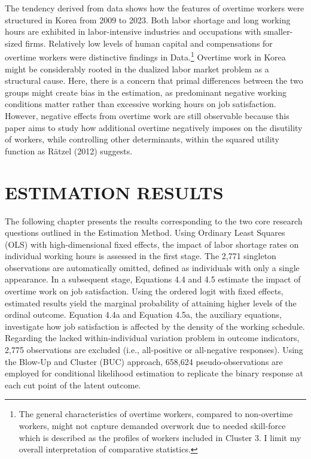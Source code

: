 \documentclass[
  12pt,
]{article}
\begin{document}
The tendency derived from data shows how the features of overtime
workers were structured in Korea from 2009 to 2023. Both labor shortage
and long working hours are exhibited in labor-intensive industries and
occupations with smaller-sized firms. Relatively low levels of human
capital and compensations for overtime workers were distinctive findings
in Data.\footnote{The general characteristics of overtime workers,
  compared to non-overtime workers, might not capture demanded overwork
  due to needed skill-force which is described as the profiles of
  workers included in Cluster 3. I limit my overall interpretation of
  comparative statistics.} Overtime work in Korea might be considerably
rooted in the dualized labor market problem as a structural cause. Here,
there is a concern that primal differences between the two groups might
create bias in the estimation, as predominant negative working
conditions matter rather than excessive working hours on job
satisfaction. However, negative effects from overtime work are still
observable because this paper aims to study how additional overtime
negatively imposes on the disutility of workers, while controlling other
determinants, within the squared utility function as Rätzel (2012)
suggests.

\newpage

\section{ESTIMATION RESULTS}\label{estimation-results}

The following chapter presents the results corresponding to the two core
research questions outlined in the Estimation Method. Using Ordinary
Least Squares (OLS) with high-dimensional fixed effects, the impact of
labor shortage rates on individual working hours is assessed in the
first stage. The 2,771 singleton observations are automatically omitted,
defined as individuals with only a single appearance. In a subsequent
stage, Equations 4.4 and 4.5 estimate the impact of overtime work on job
satisfaction. Using the ordered logit with fixed effects, estimated
results yield the marginal probability of attaining higher levels of the
ordinal outcome. Equation 4.4a and Equation 4.5a, the auxiliary
equations, investigate how job satisfaction is affected by the density
of the working schedule. Regarding the lacked within-individual
variation problem in outcome indicators, 2,775 observations are excluded
(i.e., all-positive or all-negative responses). Using the Blow-Up and
Cluster (BUC) approach, 658,624 pseudo-observations are employed for
conditional likelihood estimation to replicate the binary response at
each cut point of the latent outcome.
\end{document}
